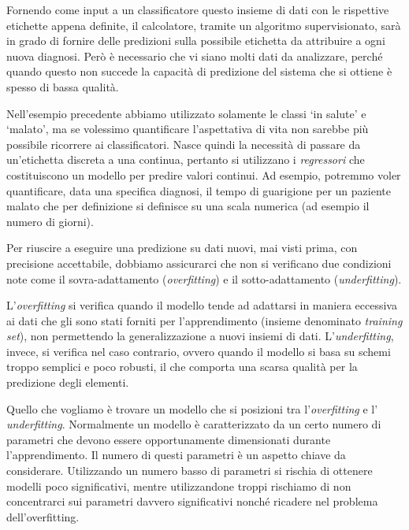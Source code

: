 \documentclass[a4paper,12pt]{report}
\begin{document}
Fornendo come input a un classificatore questo insieme di dati con le rispettive etichette appena definite, il calcolatore, tramite un algoritmo supervisionato, sarà in grado di fornire delle predizioni sulla possibile etichetta da attribuire a ogni nuova diagnosi.
Però è necessario che vi siano molti dati da analizzare, perché quando questo non succede la capacità di predizione del sistema che si ottiene è spesso di bassa qualità.

Nell'esempio precedente abbiamo utilizzato solamente le classi `in salute' e `malato', ma se volessimo quantificare l'aspettativa di vita non sarebbe più possibile ricorrere ai classificatori. Nasce quindi la necessità di passare da un'etichetta discreta a una continua, pertanto si utilizzano i \textit{regressori} che costituiscono un modello per predire valori continui.
Ad esempio, potremmo voler quantificare, data una specifica diagnosi, il tempo di guarigione per un paziente malato che per definizione si definisce su una scala numerica (ad esempio il numero di giorni).

Per riuscire a eseguire una predizione su dati nuovi, mai visti prima, con precisione accettabile, dobbiamo assicurarci che non si verificano due condizioni note come il sovra-adattamento (\textit{overfitting}) e il sotto-adattamento (\textit{underfitting}).


L’\textit{overfitting} si verifica quando il modello tende ad adattarsi in maniera eccessiva ai dati che gli sono stati forniti per l'apprendimento (insieme denominato \textit{training set}), non permettendo la generalizzazione a nuovi insiemi di dati. L’\textit{underfitting}, invece, si verifica nel caso contrario, ovvero quando il modello si basa su schemi troppo semplici e poco robusti, il che comporta una scarsa qualità per la predizione degli elementi.

Quello che vogliamo è trovare un modello che si posizioni tra l'\textit{overfitting} e l' \textit{underfitting}.
Normalmente un modello è caratterizzato da un certo numero di parametri che devono essere opportunamente dimensionati durante l'apprendimento.
Il numero di questi parametri è un aspetto chiave da considerare.
Utilizzando un numero basso di parametri si rischia di ottenere modelli poco significativi, mentre utilizzandone troppi rischiamo di non concentrarci sui parametri davvero significativi nonché ricadere nel problema dell'overfitting.
\end{document}
